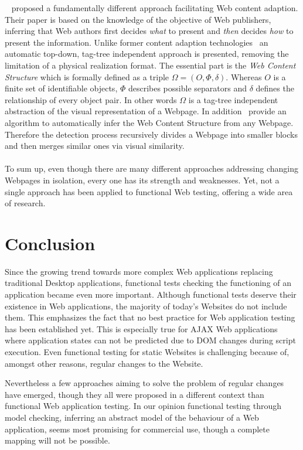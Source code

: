 \documentclass[12pt, notitlepage]{article}
\begin{document}
~\citet{understanding-web-adaption} proposed a fundamentally different approach facilitating Web content adaption. 
Their paper is based on the knowledge of the objective of Web publishers, inferring that Web authors first decides \textit{what}
to present and \textit{then} decides \textit{how} to present the information. Unlike former content adaption
technologies~\cite{function-object-model, adaptive-html-delivery} an automatic top-down, tag-tree independent approach is presented,
removing the limitation of a physical realization format. The essential part is the \textit{Web Content Structure} which is
formally defined as a triple $\Omega=(O,\Phi, \delta)$. Whereas $O$ is a finite set of identifiable objects, $\Phi$ describes
possible separators and $\delta$ defines the relationship of every object pair. In other words $\Omega$ is a tag-tree independent 
abstraction of the visual representation of a Webpage. In addition~\citet{understanding-web-adaption} provide
an algorithm to automatically infer the Web Content Structure from any Webpage. Therefore the detection process recursively 
divides a Webpage into smaller blocks and then merges similar ones via visual similarity. \\\\
To sum up, even though there are many different approaches addressing changing Webpages in isolation, every one has its strength
and weaknesses. Yet, not a single approach has been applied to functional Web testing, offering a wide area of research.

\section{Conclusion}
Since the growing trend towards more complex Web applications replacing traditional Desktop applications, functional tests checking
the functioning of an application became even more important. Although functional tests deserve their existence in Web applications, 
the majority of today’s Websites do not include them. This emphasizes the fact that no best practice for Web application
testing has been established yet. This is especially true for AJAX Web applications where application states can not be predicted due
to DOM changes during script execution. Even functional testing for static Websites is challenging because of, amongst other reasons, 
regular changes to the Website.
 
Nevertheless a few approaches aiming to solve the problem of regular changes have emerged, though they all were
proposed in a different context than functional Web application testing. In our opinion functional testing through model checking,
inferring an abstract model of the behaviour of a Web application, seems most promising for commercial use, though a complete
mapping will not be possible. 


\newpage
{}


\end{document}
